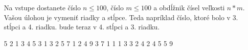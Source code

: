 




Na vstupe dostanete číslo $n \leq 100$, číslo $m \leq 100$ a obdĺžnik čísel veľkosti $n*m$. Vašou úlohou je vymeniť riadky a stĺpce. Teda napríklad číslo, ktoré bolo v 3. stĺpci a 4. riadku. bude teraz v 4. stĺpci a 3. riadku. 

 5
2 1 3 4 5
3 1 3 2 5
7 1 2 4 9
 3 7 
1 1 1 
3 3 2 
4 2 4 
5 5 9 
\koniec


